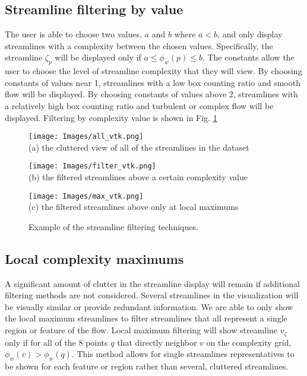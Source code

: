 \documentclass{egpubl}
\begin{document}
\subsection{Streamline filtering by value}
The user is able to choose two values, $a$ and $b$ where $a < b$, and only display streamlines with a complexity between the chosen values. 
Specifically, the streamline $\zeta_p$ will be displayed only if $a \leq \phi_w(p) \leq b$.
The constants allow the user to choose the level of streamline complexity that they will view.
By choosing constants of values near 1, streamlines with a low box counting ratio and smooth flow will be displayed.
By choosing constants of values above 2, streamlines with a relatively high box counting ratio and turbulent or complex flow will be displayed.
Filtering by complexity value is shown in Fig. \ref{fig:value_filter}

\begin{figure}[h]
        \centering
                \begin{minipage}{0.30\linewidth}
               		\small
                       	\texttt{[image: Images/all\_vtk.png]}\\(a) the cluttered view of all of the streamlines in the dataset\vspace{0.2em}
                \end{minipage}
                \begin{minipage}{0.30\linewidth}
                	\small
                        \texttt{[image: Images/filter\_vtk.png]}\\(b) the filtered streamlines above a certain complexity value \vspace{0.2em}
                \end{minipage}
                \begin{minipage}{0.30\linewidth}
                	\small
                        \texttt{[image: Images/max\_vtk.png]}\\(c) the filtered streamlines above only at local maximums \vspace{0.2em}
                \end{minipage}
        \caption{Example of the streamline filtering techniques.}
        \label{fig:value_filter}
\end{figure}

\subsection{Local complexity maximums}
A significant amount of clutter in the streamline display will remain if additional filtering methods are not considered.
Several streamlines in the visualization will be visually similar or provide redundant information.
We are able to only show the local maximum streamlines to filter streamlines that all represent a single region or feature of the flow.
Local maximum filtering will show streamline $v_\zeta$ only if for all of the 8 points $q$ that directly neighbor $v$ on the complexity grid, $\phi_w(v) > \phi_w(q)$.
This method allows for single streamlines representatives to be shown for each feature or region rather than several, cluttered streamlines.
\end{document}
